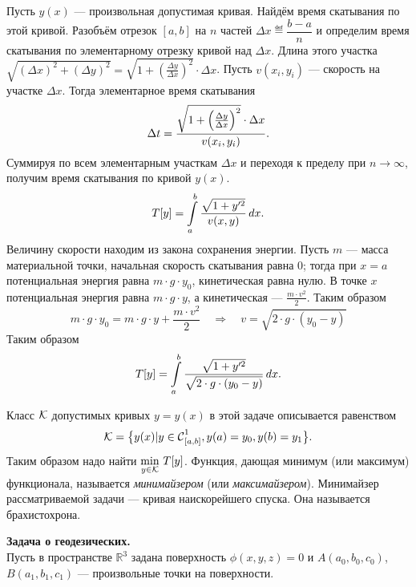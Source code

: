 \begin{enumerate2}
	Пусть $y(x)$ --- произвольная допустимая кривая. Найдём время скатывания по этой кривой. Разобъём отрезок ${[a,b]}$ на $n$ частей $\Delta x\eqdef\dfrac{b-a}{n}$ и определим время скатывания по элементарному отрезку кривой над $\Delta x$. Длина этого участка $\sqrt{(\Delta x)^2+(\Delta y)^2}=\sqrt{1+\left(\frac{\Delta y}{\Delta x}\right)^2}\cdot \Delta x$. Пусть $v(x_i, y_i)$ --- скорость на участке $\Delta x$. Тогда элементарное время скатывания
	\begin{equation*}
		\hfill\Delta t= \displaystyle \frac{\sqrt{1+\left(\frac{\Delta y}{\Delta x}\right)^2}\cdot \Delta x}{v(x_i, y_i)}. \hfill
	\end{equation*}
	Суммируя по всем элементарным участкам $\Delta x$ и переходя к пределу при $n\to\infty$, получим время скатывания по кривой $y(x)$.
	\begin{equation*}
		\hfill T[y]=\int\limits_a^b\frac{\sqrt{1+y^{\prime 2}}}{v(x,y)}\,\dd{x}.\hfill
	\end{equation*}
	Величину скорости находим из закона сохранения энергии. Пусть $m$ --- масса материальной точки, начальная скорость скатывания равна 0; тогда при $x=a$ потенциальная энергия равна $m\cdot g\cdot y_0$, кинетическая равна нулю. В точке $x$ потенциальная энергия равна $m\cdot g\cdot y$, а кинетическая --- $\frac{m\cdot v^2}{2}$. Таким образом
	\begin{equation*}
		m\cdot g\cdot y_0=m\cdot g\cdot y+\frac{m\cdot v^2}{2}\quad\Rightarrow \quad v=\sqrt{2\cdot g\cdot(y_0-y)}
	\end{equation*}
	Таким образом  
	\begin{equation*}
		\hfill T[y]=\int\limits_a^b\frac{\sqrt{1+y^{\prime 2}}}{\sqrt{2\cdot g\cdot(y_0-y)}}\,\dd{x}.\hfill
	\end{equation*}
	
	Класс $\mathcal{K}$ допустимых кривых $y=y(x)$ в этой задаче описывается равенством 	
	\begin{equation*}
		\hfill\mc{K}=\big\{y(x)|y\in\Cfn[{[a,b]}]{1}, y(a)=y_0, y(b)=y_1\big\}.\hfill
	\end{equation*}
	Таким образом надо найти $\min\limits_{y\in\mathcal{K}}\,T[y]$. Функция, дающая минимум (или максимум) функционала, называется \emph{минимайзером} (или \emph{максимайзером}). Минимайзер рассматриваемой задачи --- кривая наискорейшего спуска. Она называется брахистохрона.
	
	\item \textbf{Задача о геодезических.}\\
	Пусть в пространстве $\mathbb{R}^3$ задана поверхность $\phi(x,y,z)=0$ и $A(a_0,b_0,c_0)$, $B(a_1,b_1,c_1)$ --- произвольные точки на поверхности.
	

\end{enumerate2}
